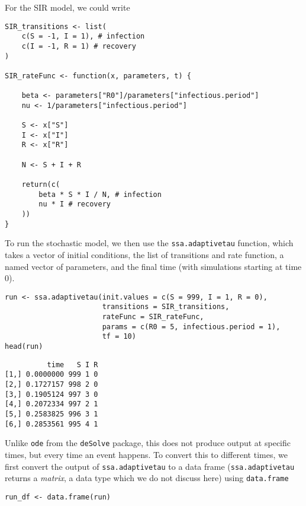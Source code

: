 \documentclass[11pt,a4paper]{article}
\begin{document}
For the SIR model, we could write \\

\begin{verbatim}
SIR_transitions <- list(
    c(S = -1, I = 1), # infection
    c(I = -1, R = 1) # recovery
)

SIR_rateFunc <- function(x, parameters, t) {

    beta <- parameters["R0"]/parameters["infectious.period"]
    nu <- 1/parameters["infectious.period"]

    S <- x["S"]
    I <- x["I"]
    R <- x["R"]

    N <- S + I + R

    return(c(
        beta * S * I / N, # infection
        nu * I # recovery
    ))
}
\end{verbatim}

To run the stochastic model, we then use the \verb~ssa.adaptivetau~ function, which takes a vector of initial conditions, the list of transitions and rate function, a named vector of parameters, and the final time (with simulations starting at time 0). \\

\begin{verbatim}
run <- ssa.adaptivetau(init.values = c(S = 999, I = 1, R = 0),
                       transitions = SIR_transitions,
                       rateFunc = SIR_rateFunc,
                       params = c(R0 = 5, infectious.period = 1),
                       tf = 10)
head(run)
\end{verbatim}

\begin{verbatim}
          time   S I R
[1,] 0.0000000 999 1 0
[2,] 0.1727157 998 2 0
[3,] 0.1905124 997 3 0
[4,] 0.2072334 997 2 1
[5,] 0.2583825 996 3 1
[6,] 0.2853561 995 4 1
\end{verbatim}

Unlike \texttt{ode} from the \texttt{deSolve} package, this does not produce output at specific times, but every time an event happens. To convert this to different times, we first convert the output of \texttt{ssa.adaptivetau} to a data frame (\texttt{ssa.adaptivetau} returns a \emph{matrix}, a data type which we do not discuss here) using \texttt{data.frame} \\

\begin{verbatim}
run_df <- data.frame(run)
\end{verbatim}
\end{document}
